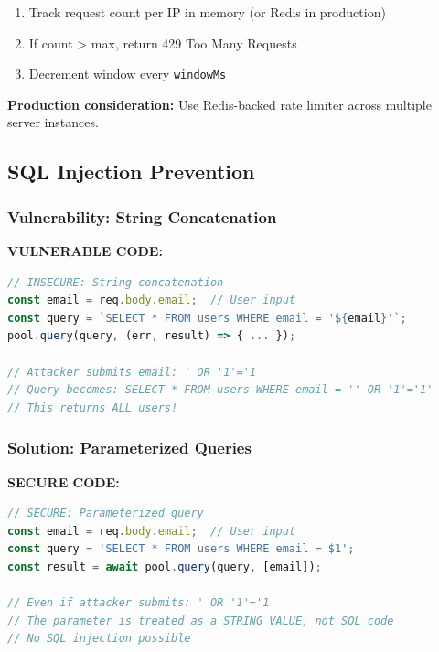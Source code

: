 \documentclass[12pt,a4paper,oneside]{article}
\begin{document}
\begin{enumerate}
    \item Track request count per IP in memory (or Redis in production)
    \item If count > max, return 429 Too Many Requests
    \item Decrement window every \texttt{windowMs}
\end{enumerate}

\textbf{Production consideration:} Use Redis-backed rate limiter across multiple server instances.

\subsection{SQL Injection Prevention}

\subsubsection{Vulnerability: String Concatenation}

\textbf{VULNERABLE CODE:}

\begin{lstlisting}[language=JavaScript, caption=SQL Injection Vulnerability (DON'T USE)]
// INSECURE: String concatenation
const email = req.body.email;  // User input
const query = `SELECT * FROM users WHERE email = '${email}'`;
pool.query(query, (err, result) => { ... });

// Attacker submits email: ' OR '1'='1
// Query becomes: SELECT * FROM users WHERE email = '' OR '1'='1'
// This returns ALL users!
\end{lstlisting}

\subsubsection{Solution: Parameterized Queries}

\textbf{SECURE CODE:}

\begin{lstlisting}[language=JavaScript, caption=Parameterized Query (Safe)]
// SECURE: Parameterized query
const email = req.body.email;  // User input
const query = 'SELECT * FROM users WHERE email = $1';
const result = await pool.query(query, [email]);

// Even if attacker submits: ' OR '1'='1
// The parameter is treated as a STRING VALUE, not SQL code
// No SQL injection possible
\end{lstlisting}
\end{document}
